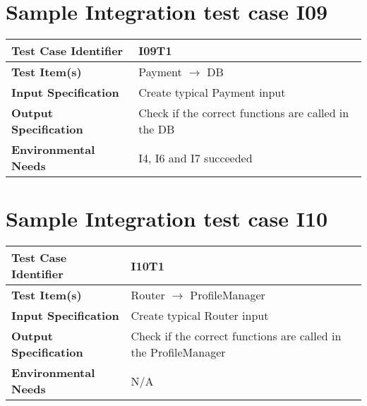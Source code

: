 \section{Sample Integration test case I09}\label{I09}
\begin{center}
	\vspace{0.6cm}
	\begin{tabular}{|l|l|}
		\hline
		\textbf{Test Case Identifier} & I09T1 \bigstrut \\\hline
		\textbf{Test Item(s)} & Payment \ensuremath{\rightarrow} DB \bigstrut \\\hline
		\textbf{Input Specification} & Create typical Payment input \bigstrut \\\hline
		\textbf{Output Specification} & Check if the correct functions are called in the DB \bigstrut \\\hline
		\textbf{Environmental Needs} & I4, I6 and I7 succeeded \bigstrut \\\hline
	\end{tabular}
\end{center}

\section{Sample Integration test case I10}\label{I10}
\begin{center}
	\vspace{0.6cm}
	\begin{tabular}{|l|l|}
		\hline
		\textbf{Test Case Identifier} & I10T1 \bigstrut \\\hline
		\textbf{Test Item(s)} & Router \ensuremath{\rightarrow} ProfileManager \bigstrut \\\hline
		\textbf{Input Specification} & Create typical Router input \bigstrut \\\hline
		\textbf{Output Specification} & Check if the correct functions are called in the ProfileManager \bigstrut \\\hline
		\textbf{Environmental Needs} & N/A \bigstrut \\\hline
	\end{tabular}
\end{center}

